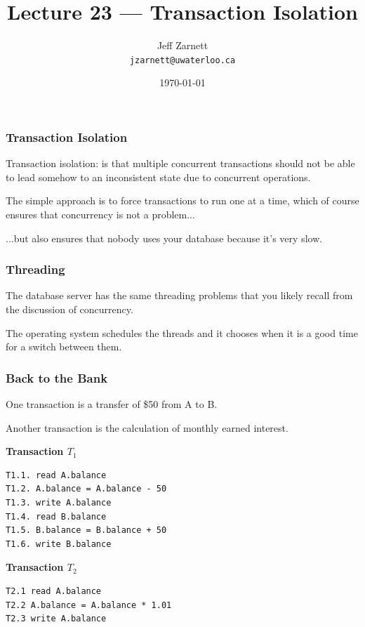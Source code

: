 

\title{Lecture 23 --- Transaction Isolation }

\author{Jeff Zarnett \\ \small \texttt{jzarnett@uwaterloo.ca}}
\date{\today}




\begin{frame}
  \titlepage

 \end{frame}



\begin{frame}
\frametitle{Transaction Isolation}
Transaction isolation: is that multiple concurrent transactions should not be able to lead somehow to an inconsistent state due to concurrent operations. 

The simple approach is to force transactions to run one at a time, which of course ensures that concurrency is not a problem... 

...but also ensures that nobody uses your database because it's very slow.

\end{frame}

\begin{frame}
\frametitle{Threading}

The database server has the same threading problems that you likely recall from the discussion of concurrency.

The operating system schedules the threads and it chooses when it is a good time for a switch between them.

\end{frame}

\begin{frame}[fragile]
\frametitle{Back to the Bank}

One transaction is a transfer of \$50 from A to B.

Another transaction is the calculation of monthly earned interest.

{\scriptsize
\begin{multicols}{2}
\textbf{Transaction $T_{1}$}
\begin{verbatim}
T1.1. read A.balance
T1.2. A.balance = A.balance - 50
T1.3. write A.balance
T1.4. read B.balance
T1.5. B.balance = B.balance + 50
T1.6. write B.balance
\end{verbatim}
\columnbreak
\textbf{Transaction $T_{2}$}

\begin{verbatim}
T2.1 read A.balance
T2.2 A.balance = A.balance * 1.01
T2.3 write A.balance
\end{verbatim}

\end{multicols}
}

\end{frame}


